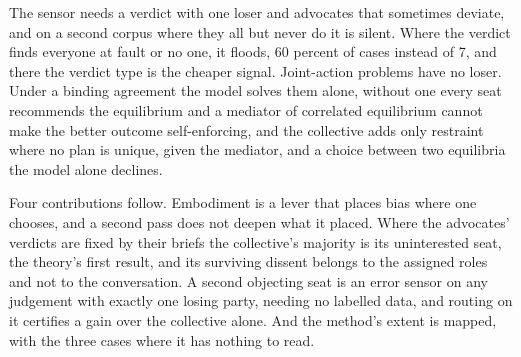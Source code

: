 The sensor needs a verdict with one loser and advocates that sometimes
deviate, and on a second corpus where they all but never do it is silent.
Where the verdict finds everyone at fault or no one, it floods, 60 percent
of cases instead of 7, and there the verdict type is
the cheaper signal.
Joint-action problems have no loser. Under a binding agreement the model
solves them alone, without one every seat recommends the equilibrium and a
mediator of correlated equilibrium \citep{aumann1974subjectivity} cannot
make the better outcome self-enforcing, and the collective adds only
restraint where no plan is unique, given the mediator, and a choice between
two equilibria the model alone declines.

Four contributions follow. Embodiment is a lever that places bias where one
chooses, and a second pass does not deepen what it placed. Where the
advocates' verdicts are fixed by their briefs the collective's majority is
its uninterested seat, the theory's first result, and its surviving dissent
belongs to the assigned roles and not to the conversation. A second
objecting seat is an error sensor on any judgement with exactly one losing
party, needing no labelled data, and routing on it certifies a gain over the
collective alone. And the method's extent is mapped, with the three cases
where it has nothing to read.

